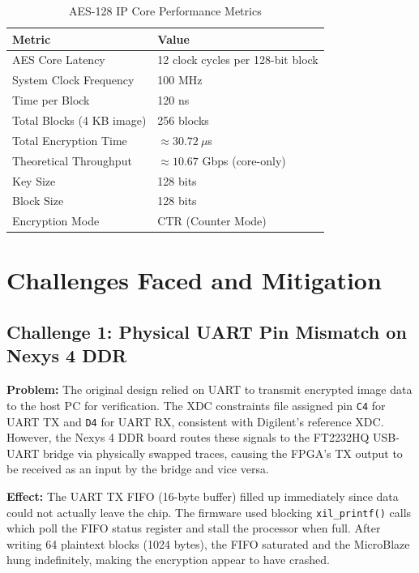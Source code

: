 \begin{table}[H]
\centering
\caption{AES-128 IP Core Performance Metrics}
\begin{tabular}{ll}
\toprule
\textbf{Metric} & \textbf{Value} \\
\midrule
AES Core Latency          & 12 clock cycles per 128-bit block \\
System Clock Frequency    & 100 MHz \\
Time per Block            & 120 ns \\
Total Blocks (4 KB image) & 256 blocks \\
Total Encryption Time     & $\approx 30.72\ \mu$s \\
Theoretical Throughput    & $\approx 10.67$ Gbps (core-only) \\
Key Size                  & 128 bits \\
Block Size                & 128 bits \\
Encryption Mode           & CTR (Counter Mode) \\
\bottomrule
\end{tabular}
\end{table}

\section{Challenges Faced and Mitigation}
\label{sec:challenges}

\subsection{Challenge 1: Physical UART Pin Mismatch on Nexys 4 DDR}

\textbf{Problem:} The original design relied on UART to transmit encrypted image data to the host PC for verification. The XDC constraints file assigned pin \texttt{C4} for UART TX and \texttt{D4} for UART RX, consistent with Digilent's reference XDC. However, the Nexys 4 DDR board routes these signals to the FT2232HQ USB-UART bridge via physically swapped traces, causing the FPGA's TX output to be received as an input by the bridge and vice versa.

\textbf{Effect:} The UART TX FIFO (16-byte buffer) filled up immediately since data could not actually leave the chip. The firmware used blocking \texttt{xil\_printf()} calls which poll the FIFO status register and stall the processor when full. After writing 64 plaintext blocks (1024 bytes), the FIFO saturated and the MicroBlaze hung indefinitely, making the encryption appear to have crashed.

